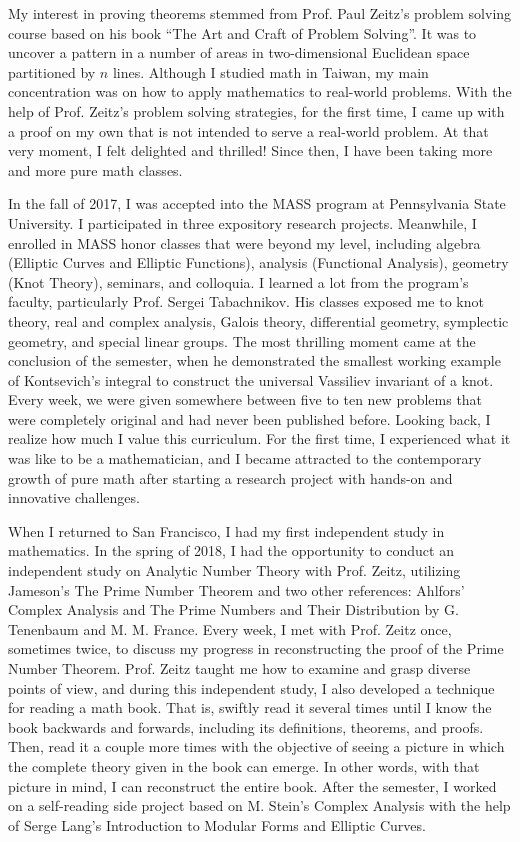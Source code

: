 \documentclass[10pt]{amsart}
\begin{document}
My interest in proving theorems stemmed from Prof. Paul Zeitz's problem solving course based on his book ``The Art and Craft of Problem Solving''. It was to uncover a pattern in a number of areas in two-dimensional Euclidean space partitioned by $n$ lines. Although I studied math in Taiwan, my main concentration was on how to apply mathematics to real-world problems. With the help of Prof. Zeitz's problem solving strategies, for the first time, I came up with a proof on my own that is not intended to serve a real-world problem. At that very moment, I felt delighted and thrilled! Since then, I have been taking more and more pure math classes.


In the fall of 2017, I was accepted into the MASS program at Pennsylvania State University. I participated in three expository research projects. Meanwhile, I enrolled in MASS honor classes that were beyond my level, including algebra (Elliptic Curves and Elliptic Functions), analysis (Functional Analysis), geometry (Knot Theory), seminars, and colloquia. I learned a lot from the program's faculty, particularly Prof. Sergei Tabachnikov. His classes exposed me to knot theory, real and complex analysis, Galois theory, differential geometry, symplectic geometry, and special linear groups. The most thrilling moment came at the conclusion of the semester, when he demonstrated the smallest working example of Kontsevich’s integral to construct the universal Vassiliev invariant of a knot. Every week, we were given somewhere between five to ten new problems that were completely original and had never been published before. Looking back, I realize how much I value this curriculum. For the first time, I experienced what it was like to be a mathematician, and I became attracted to the contemporary growth of pure math after starting a research project with hands-on and innovative challenges.


When I returned to San Francisco, I had my first independent study in mathematics. In the spring of 2018, I had the opportunity to conduct an independent study on Analytic Number Theory with Prof. Zeitz, utilizing Jameson's The Prime Number Theorem and two other references: Ahlfors' Complex Analysis and The Prime Numbers and Their Distribution by G. Tenenbaum and M. M. France. Every week, I met with Prof. Zeitz once, sometimes twice, to discuss my progress in reconstructing the proof of the Prime Number Theorem. Prof. Zeitz taught me how to examine and grasp diverse points of view, and during this independent study, I also developed a technique for reading a math book. That is, swiftly read it several times until I know the book backwards and forwards, including its definitions, theorems, and proofs. Then, read it a couple more times with the objective of seeing a picture in which the complete theory given in the book can emerge. In other words, with that picture in mind, I can reconstruct the entire book. After the semester, I worked on a self-reading side project based on M. Stein's Complex Analysis with the help of Serge Lang's Introduction to Modular Forms and Elliptic Curves.
\end{document}
